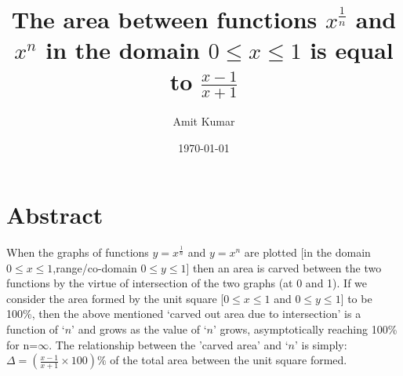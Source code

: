 \documentclass[10pt, twoside]{article}
\title{The area between functions $x^{\frac{1}{n}}$ and $x^n$ in the domain $0 \le x \le 1$ is equal to $\frac{x-1}{x+1}$}
\author{Amit Kumar}
\date{\today}
\begin{document}
\maketitle
\section{Abstract}
When the graphs of functions $y=x^{\frac{1}{n}}$ and $y=x^n$ are plotted [in the domain $0 \le x \le 1$,range/co-domain $0 \le y \le 1$] then an area is carved between the two functions by the virtue of intersection of the two graphs (at 0 and 1). If we consider the area formed by the unit square [$0 \le x \le 1$ and $0 \le y \le 1$] to be 100\%, then the above mentioned `carved out area due to intersection' is a function of `$n$' and grows as the value of `$n$' grows, asymptotically reaching 100\% for n=$\infty$. The relationship between the 'carved area' and `$n$' is simply: $\Delta = (\frac{x-1}{x+1}\times{100})\%$ of the total area between the unit square formed.
\end{document}
